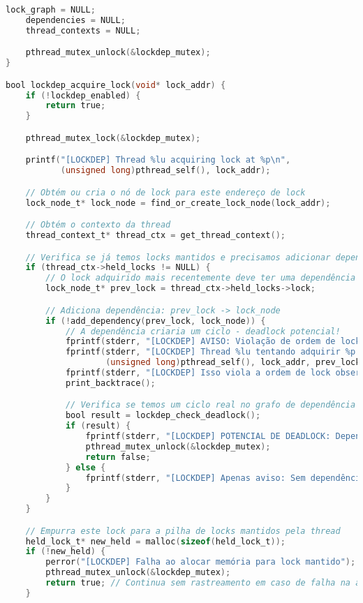 \begin{lstlisting}[language=C, caption={lockdep\_core.c - Implementação do sistema de detecção de deadlocks}]
    lock_graph = NULL;
    dependencies = NULL;
    thread_contexts = NULL;

    pthread_mutex_unlock(&lockdep_mutex);
}

bool lockdep_acquire_lock(void* lock_addr) {
    if (!lockdep_enabled) {
        return true;
    }

    pthread_mutex_lock(&lockdep_mutex);

    printf("[LOCKDEP] Thread %lu acquiring lock at %p\n",
           (unsigned long)pthread_self(), lock_addr);

    // Obtém ou cria o nó de lock para este endereço de lock
    lock_node_t* lock_node = find_or_create_lock_node(lock_addr);

    // Obtém o contexto da thread
    thread_context_t* thread_ctx = get_thread_context();

    // Verifica se já temos locks mantidos e precisamos adicionar dependências
    if (thread_ctx->held_locks != NULL) {
        // O lock adquirido mais recentemente deve ter uma dependência neste novo lock
        lock_node_t* prev_lock = thread_ctx->held_locks->lock;

        // Adiciona dependência: prev_lock -> lock_node
        if (!add_dependency(prev_lock, lock_node)) {
            // A dependência criaria um ciclo - deadlock potencial!
            fprintf(stderr, "[LOCKDEP] AVISO: Violação de ordem de lock detectada!\n");
            fprintf(stderr, "[LOCKDEP] Thread %lu tentando adquirir %p enquanto mantém %p\n",
                    (unsigned long)pthread_self(), lock_addr, prev_lock->lock_addr);
            fprintf(stderr, "[LOCKDEP] Isso viola a ordem de lock observada anteriormente e pode levar a deadlocks.\n");
            print_backtrace();

            // Verifica se temos um ciclo real no grafo de dependência
            bool result = lockdep_check_deadlock();
            if (result) {
                fprintf(stderr, "[LOCKDEP] POTENCIAL DE DEADLOCK: Dependência circular de lock detectada!\n");
                pthread_mutex_unlock(&lockdep_mutex);
                return false;
            } else {
                fprintf(stderr, "[LOCKDEP] Apenas aviso: Sem dependência circular ainda, mas ordem de lock inconsistente\n");
            }
        }
    }

    // Empurra este lock para a pilha de locks mantidos pela thread
    held_lock_t* new_held = malloc(sizeof(held_lock_t));
    if (!new_held) {
        perror("[LOCKDEP] Falha ao alocar memória para lock mantido");
        pthread_mutex_unlock(&lockdep_mutex);
        return true; // Continua sem rastreamento em caso de falha na alocação
    }


\end{lstlisting}
